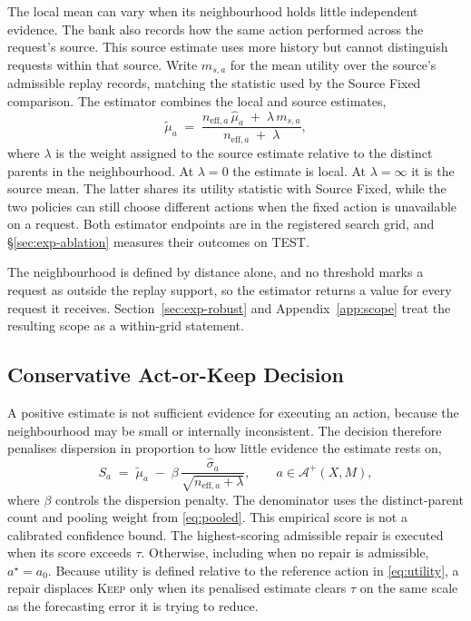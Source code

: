 \documentclass{article}
\newcommand{\calA}{\mathcal{A}}
\begin{document}
The local mean can vary when its neighbourhood holds little independent evidence. The bank
also records how the same action performed across the request's source. This source estimate
uses more history but cannot distinguish requests within that source. Write $m_{s,a}$ for the
mean utility over the source's admissible replay records, matching the statistic used by the
Source Fixed comparison. The estimator combines the local and source estimates,
\begin{equation}
  \tilde\mu_a \;=\; \frac{n_{\mathrm{eff},a}\,\hat\mu_a \;+\; \lambda\, m_{s,a}}
                          {n_{\mathrm{eff},a} \;+\; \lambda} ,
  \label{eq:pooled}
\end{equation}
where $\lambda$ is the weight assigned to the source estimate relative to the distinct
parents in the neighbourhood. At $\lambda=0$ the estimate is local. At
$\lambda=\infty$ it is the source mean. The latter shares its utility statistic with
Source Fixed, while the two policies can still choose different actions when the fixed
action is unavailable on a request. Both estimator endpoints are in the registered search
grid, and \S\ref{sec:exp-ablation} measures their outcomes on TEST.

The neighbourhood is defined by distance alone, and no threshold marks a request as outside the
replay support, so the estimator returns a value for every request it receives.
Section~\ref{sec:exp-robust} and Appendix~\ref{app:scope} treat the resulting scope as a
within-grid statement.

\subsection{Conservative Act-or-Keep Decision}
\label{sec:method-decision}
A positive estimate is not sufficient evidence for executing an action, because the
neighbourhood may be small or internally inconsistent. The decision therefore penalises
dispersion in proportion to how little evidence the estimate rests on,
\begin{equation}
  S_a \;=\; \tilde\mu_a \;-\; \beta\, \frac{\hat\sigma_a}{\sqrt{n_{\mathrm{eff},a} + \lambda}},
  \qquad a \in \calA^{+}(X,M),
  \label{eq:score}
\end{equation}
where $\beta$ controls the dispersion penalty. The denominator uses the distinct-parent
count and pooling weight from \eqref{eq:pooled}. This empirical score is not a calibrated
confidence bound. The highest-scoring admissible repair is executed when its score exceeds
$\tau$. Otherwise, including when no repair is admissible, $a^{\star}=a_0$. Because utility is
defined relative to the reference action in \eqref{eq:utility}, a repair displaces
\textsc{Keep} only when its penalised estimate clears $\tau$ on the same scale as the
forecasting error it is trying to reduce.
\end{document}
